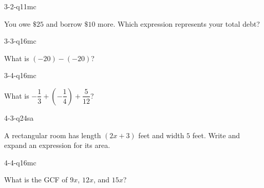 \begin{practiceQuestion}{3-2-q11}{mc}
\begin{questionText}
You owe $\$25$ and borrow $\$10$ more. Which expression represents your total debt?
\end{questionText}
\end{practiceQuestion}

\begin{practiceQuestion}{3-3-q16}{mc}
\begin{questionText}
What is $(-20) - (-20)$?
\end{questionText}
\end{practiceQuestion}

\begin{practiceQuestion}{3-4-q16}{mc}
\begin{questionText}
What is $-\dfrac{1}{3} + \left(-\dfrac{1}{4}\right) + \dfrac{5}{12}$?
\end{questionText}
\end{practiceQuestion}

\begin{practiceQuestion}{4-3-q24}{sa}
\begin{questionText}
A rectangular room has length $(2x + 3)$ feet and width $5$ feet. Write and expand an expression for its area.
\end{questionText}
\end{practiceQuestion}

\begin{practiceQuestion}{4-4-q16}{mc}
\begin{questionText}
What is the GCF of $9x$, $12x$, and $15x$?
\end{questionText}
\end{practiceQuestion}

